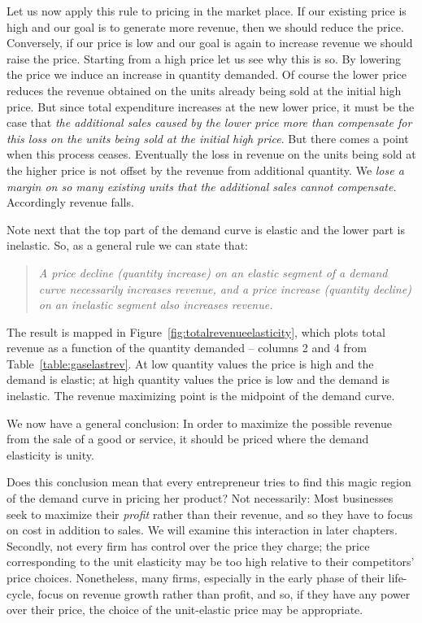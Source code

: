 Let us now apply this rule to pricing in the market place. If our existing
price is high and our goal is to generate more revenue, then we should
reduce the price. Conversely, if our price is low and our goal is again to
increase revenue we should raise the price. Starting from a high price let
us see why this is so. By lowering the price we induce an increase in
quantity demanded. Of course the lower price reduces the revenue obtained on
the units already being sold at the initial high price. But since total
expenditure increases at the new lower price, it must be the case that 
\textit{the additional sales caused by the lower price more than compensate
for this loss on the units being sold at the initial high price}. But
there comes a point when this process ceases. Eventually the loss in revenue
on the units being sold at the higher price is not offset by the revenue
from additional quantity. We \textit{lose a margin on so many existing units
that the additional sales cannot compensate}. Accordingly revenue falls.

\newhtmlpage

Note next that the top part of the demand curve is elastic and the lower
part is inelastic. So, as a general rule we can state that:

\begin{quote}
\textit{A price decline (quantity increase) on an elastic segment of a
demand curve necessarily increases revenue, and a price increase (quantity
decline) on an inelastic segment also increases revenue.}
\end{quote}

The result is mapped in Figure~\ref{fig:totalrevenueelasticity}, which plots
total revenue as a function of the quantity demanded -- columns 2 and 4 from
Table~\ref{table:gaselastrev}. At low quantity values the price is high and the demand is
elastic; at high quantity values the price is low and the demand is
inelastic. The revenue maximizing point is the midpoint of the demand curve.



\newhtmlpage

We now have a general conclusion: In order to maximize the possible revenue
from the sale of a good or service, it should be priced where the demand
elasticity is unity.

Does this conclusion mean that every entrepreneur tries to find this magic
region of the demand curve in pricing her product? Not necessarily: Most
businesses seek to maximize their \textit{profit} rather than their revenue,
and so they have to focus on cost in addition to sales. We will examine this
interaction in later chapters. Secondly, not every firm has control over the
price they charge; the price corresponding to the unit elasticity may be too
high relative to their competitors' price choices. Nonetheless, many firms,
especially in the early phase of their life-cycle, focus on revenue growth
rather than profit, and so, if they have any power over their price, the
choice of the unit-elastic price may be appropriate.

